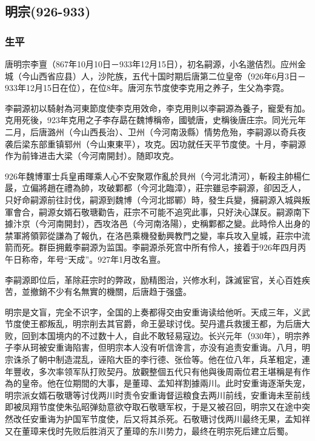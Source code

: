 
\subsection{明宗\tiny(926-933)}

\subsubsection{生平}

唐明宗李亶（867年10月10日－933年12月15日），初名嗣源，小名邈佶烈。应州金城（今山西省应县）人，沙陀族，五代十国时期后唐第二位皇帝（926年6月3日－933年12月15日在位），在位8年。唐河东节度使李克用之养子，生父為李霓。

李嗣源初以騎射為河東節度使李克用效命，李克用則以李嗣源為養子，寵愛有加。克用死後，923年克用之子李存勗在魏博稱帝，國號唐，史稱後唐庄宗。同光元年二月，后唐潞州（今山西長治）、卫州（今河南汲縣）情势危殆，李嗣源以奇兵夜袭后梁东部重镇郓州（今山東東平），攻克。因功就任天平节度使。十月，李嗣源作为前锋进击大梁（今河南開封）。随即攻克。

926年魏博軍士兵皇甫暉乘人心不安聚眾作亂於貝州（今河北清河），斬殺主帥楊仁晸，立偏將趙在禮為帥，攻破鄴都（今河北臨漳），莊宗雖忌李嗣源，卻因乏人，只好命嗣源前往討伐，嗣源到魏博（今河北邯鄲）時，發生兵變，擁嗣源入城與叛軍會合，嗣源女婿石敬瑭勸告，莊宗不可能不追究此事，只好決心謀反。嗣源南下據汴京（今河南開封），西攻洛邑（今河南洛陽），史稱鄴都之變。此時伶人出身的禁軍將領郭從謙為了報仇，在洛邑乘機發動興教門之變，率兵攻入皇城，莊宗中流箭而死。群臣拥戴李嗣源为监国。李嗣源杀死宫中所有伶人，接着于926年四月丙午日称帝，年号“天成”。927年1月改名亶。

李嗣源即位后，革除莊宗时的弊政，励精图治，兴修水利，誅滅宦官，关心百姓疾苦，並撤銷不少有名無實的機關，后唐趋于强盛。

明宗是文盲，完全不识字，全国的上奏都得交由安重诲读给他听。天成三年，义武节度使王都叛乱，明宗削去其官爵，命王晏球讨伐。契丹遣兵救援王都，为后唐大败，回到本国境内的不过数十人，自此不敢轻易寇边。长兴元年（930年），明宗养子李从珂被安重诲陷害，但明宗本人没有听信谗言，亦没有追责安重诲。八月，明宗诛杀了朝中制造混乱，诬陷大臣的李行德、张俭等。他在位八年，兵革粗定，連年豐收，多次率领军队打败契丹。放觀整個五代只有他與後周兩位君王堪稱是有作為的皇帝。他在位期間的大事，是董璋、孟知祥割據兩川。此时安重诲逐渐失宠，明宗派女婿石敬瑭等讨伐两川时责令安重诲督运粮食去两川前线，安重诲未至前线即被凤翔节度使朱弘昭弹劾意欲夺取石敬瑭军权，于是又被召回，明宗又在途中突然改任安重诲为护国军节度使，后又将其杀死。石敬瑭讨伐两川最终无果，孟知祥又在董璋来伐时先败后胜消灭了董璋的东川势力，最终在明宗死后建立后蜀。

